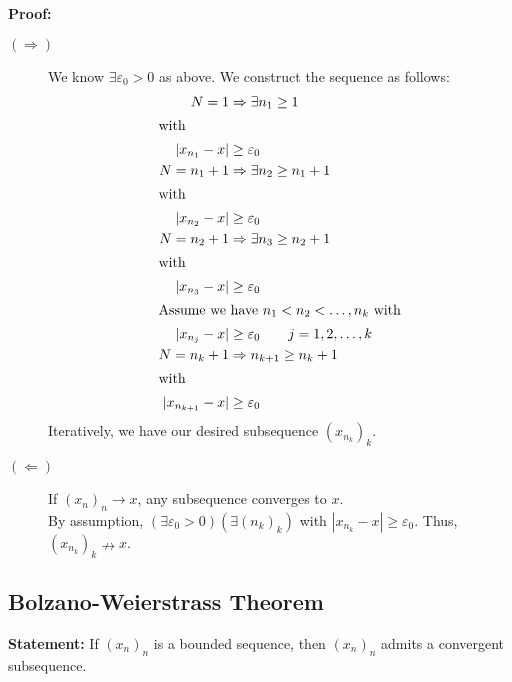 \documentclass[10pt]{extarticle}
\begin{document}
    \textbf{Proof:}
    \begin{description}
      \item[$(\Rightarrow)$] We know $\exists \varepsilon_0 > 0$ as above. We construct the sequence as follows:
        \begin{align*}
          N = 1 &\Rightarrow \exists n_1 \geq 1\\
          \shortintertext{with}
          |x_{n_1} - x |&\geq \varepsilon_0\\
          N = n_1 + 1 &\Rightarrow \exists n_2 \geq n_1 + 1\\
          \shortintertext{with}
          |x_{n_2} - x| &\geq \varepsilon_0\\
          N = n_2 + 1 &\Rightarrow \exists n_3 \geq n_2 + 1\\
          \shortintertext{with}
          |x_{n_3} - x| &\geq \varepsilon_0\\
          \shortintertext{Assume we have $n_1 < n_2< \dots, n_k$ with}
          |x_{n_j} - x| &\geq \varepsilon_0 \tag*{$j = 1,2,\dots,k$}\\
          N = n_k + 1 &\Rightarrow n_{k+1} \geq n_k + 1\\
          \shortintertext{with}
          |x_{n_{k+1}} - x| &\geq \varepsilon_0
        \end{align*}
        Iteratively, we have our desired subsequence $(x_{n_k})_k$.
      \item[$(\Leftarrow)$] If $(x_n)_n\rightarrow x$, any subsequence converges to $x$.\\

        By assumption, $\left(\exists \varepsilon_0 >0\right)\left(\exists (n_k)_k\right)$ with $|x_{n_k} - x| \geq \varepsilon_0$. Thus, $(x_{n_k})_k \nrightarrow x$.
    \end{description}
    \subsection{Bolzano-Weierstrass Theorem}%
    \textbf{Statement:} If $(x_n)_n$ is a bounded sequence, then $(x_n)_n$ admits a convergent subsequence.\\
\end{document}

